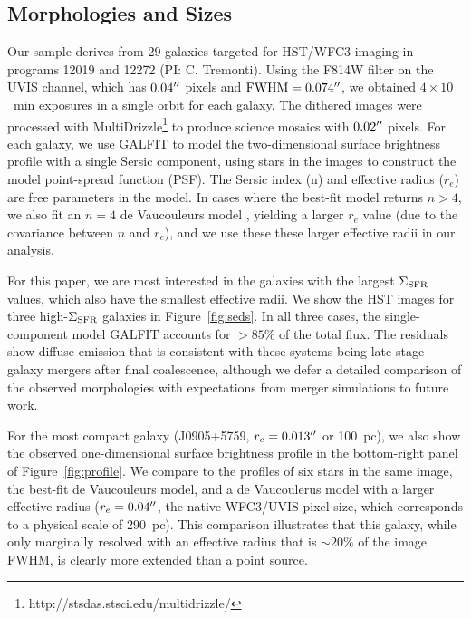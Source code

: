 \documentclass[apj]{emulateapj}
\newcommand{\sigmasfr}{\Sigma_{\textnormal{\scriptsize{SFR}}}}
\begin{document}
\subsection{Morphologies and Sizes}

Our sample derives from 29 galaxies targeted for HST/WFC3 imaging in
programs 12019 and 12272 (PI: C. Tremonti).  Using the F814W filter on
the UVIS channel, which has $0.04\mbox{$^{\prime\prime}$}$ pixels and
$\textnormal{FWHM}=0.074\mbox{$^{\prime\prime}$}$, we obtained $4\times10$~min
exposures in a single orbit for each galaxy.  The dithered images were
processed with
MultiDrizzle\footnote{http://stsdas.stsci.edu/multidrizzle/} to
produce science mosaics with $0.02\mbox{$^{\prime\prime}$}$ pixels.  For each galaxy,
we use GALFIT \citep{pen02,pen10} to model the two-dimensional surface
brightness profile with a single Sersic component, using stars in the
images to construct the model point-spread function (PSF).  The Sersic
index (n) and effective radius ($r_e$) are free parameters in the
model.  In cases where the best-fit model returns $n>4$, we also fit
an $n=4$ de Vaucouleurs model \citep{dev48}, yielding a larger $r_e$
value (due to the covariance between $n$ and $r_e$), and we use these
these larger effective radii in our analysis.

For this paper, we are most interested in the galaxies with the
largest $\sigmasfr$ values, which also have the smallest effective
radii.  We show the HST images for three high-$\sigmasfr$ galaxies in
Figure~\ref{fig:seds}.  In all three cases, the single-component model
GALFIT accounts for $>85\%$ of the total flux.  The residuals show
diffuse emission that is consistent with these systems being
late-stage galaxy mergers after final coalescence, although we defer a
detailed comparison of the observed morphologies with expectations
from merger simulations to future work.

For the most compact galaxy (J0905+5759, $r_e=0.013\mbox{$^{\prime\prime}$}$ or
100~pc), we also show the observed one-dimensional surface brightness
profile in the bottom-right panel of Figure~\ref{fig:profile}.  We
compare to the profiles of six stars in the same image, the best-fit
de Vaucouleurs model, and a de Vaucoulerus model with a larger
effective radius ($r_e=0.04\mbox{$^{\prime\prime}$}$, the native WFC3/UVIS pixel size,
which corresponds to a physical scale of 290~pc).  This comparison
illustrates that this galaxy, while only marginally resolved with an
effective radius that is $\sim20\%$ of the image FWHM, is clearly more
extended than a point source.
\end{document}
